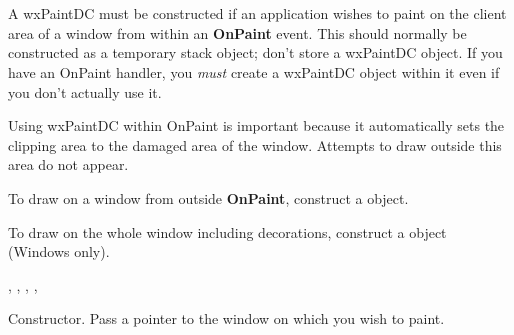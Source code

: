 \section{}\label{wxpaintdc}

A wxPaintDC must be constructed if an application wishes to paint on the
client area of a window from within an {\bf OnPaint} event.
This should normally be constructed as a temporary stack object; don't store
a wxPaintDC object. If you have an OnPaint handler, you {\it must} create a wxPaintDC
object within it even if you don't actually use it.

Using wxPaintDC within OnPaint is important because it automatically
sets the clipping area to the damaged area of the window. Attempts to draw
outside this area do not appear.

To draw on a window from outside {\bf OnPaint}, construct a  object.

To draw on the whole window including decorations, construct a  object
(Windows only).




, , ,\rtfsp
{}, 




Constructor. Pass a pointer to the window on which you wish to paint.



